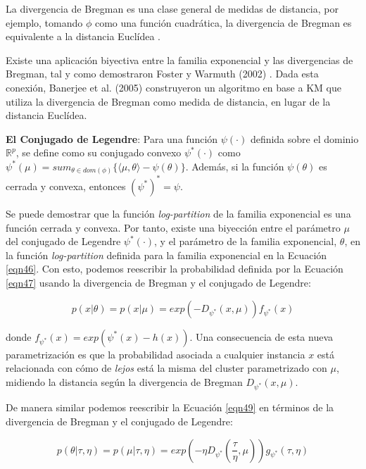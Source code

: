 La divergencia de Bregman es una clase general de medidas de distancia, por ejemplo, tomando $\phi$ como una función cuadrática, la divergencia de Bregman es equivalente a la distancia Euclídea \cite{Banerjee:2005}.

Existe una aplicación biyectiva entre la familia exponencial y las divergencias de Bregman, tal y como demostraron Foster y Warmuth (2002) \cite{Forster:2002}. Dada esta conexión, Banerjee et al. (2005) \cite{Banerjee:2005} construyeron un algoritmo en base a \acf{KM} que utiliza la divergencia de Bregman como medida de distancia, en lugar de la distancia Euclídea.

\begin{definicion}
	
	\textbf{El Conjugado de Legendre}: Para una función $\psi(\cdot)$ definida sobre el dominio $\mathbb{R}^p$, se define como su conjugado convexo $\psi^*(\cdot)$ como $\psi^*(\mu) = sum_{\theta \in dom(\phi)}\{\langle \mu, \theta \rangle - \psi(\theta) \}$. Además, si la función $\psi(\theta)$ es cerrada y convexa, entonces $(\psi^*)^* = \psi$. \cite{RDPM:2015}
	
\end{definicion}


Se puede demostrar que la función \textit{log-partition} de la familia exponencial es una función cerrada y convexa. Por tanto, existe una biyección entre el parámetro $\mu$ del conjugado de Legendre $\psi^*(\cdot)$, y el parámetro de la familia exponencial, $\theta$, en la función \textit{log-partition} definida para la familia exponencial en la Ecuación \ref{eqn46}. Con esto, podemos reescribir la probabilidad definida por la Ecuación \ref{eqn47} usando la divergencia de Bregman y el conjugado de Legendre:

\begin{equation}
p(x|\theta) = p(x|\mu) = exp(-D_{\psi^*}(x, \mu)) f_{\psi^*}(x)
\label{eqn54}
\end{equation}

donde $f_{\psi^*}(x) = exp(\psi^*(x) - h(x))$. Una consecuencia de esta nueva parametrización es que la probabilidad asociada a cualquier instancia $x$ está relacionada con cómo de \textit{lejos} está la misma del cluster parametrizado con $\mu$, midiendo la distancia según la divergencia de Bregman $D_{\psi^*}(x, \mu)$.

De manera similar podemos reescribir la Ecuación \ref{eqn49} en términos de la divergencia de Bregman y el conjugado de Legendre:

\begin{equation}
p(\theta|\tau, \eta) = p(\mu|\tau, \eta) = exp \left(-\eta D_{\psi^*}(\frac{\tau}{\eta}, \mu)\right) g_{\psi^*}(\tau, \eta)
\label{eqn55}
\end{equation}

